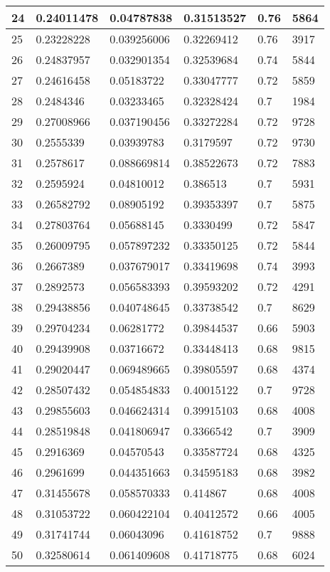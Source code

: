 \begin{longtable}{|l|l|l|l|l|l|}
24 & 0.24011478 & 0.04787838 & 0.31513527 & 0.76 & 5864 \\ \hline 
25 & 0.23228228 & 0.039256006 & 0.32269412 & 0.76 & 3917 \\ \hline 
26 & 0.24837957 & 0.032901354 & 0.32539684 & 0.74 & 5844 \\ \hline 
27 & 0.24616458 & 0.05183722 & 0.33047777 & 0.72 & 5859 \\ \hline 
28 & 0.2484346 & 0.03233465 & 0.32328424 & 0.7 & 1984 \\ \hline 
29 & 0.27008966 & 0.037190456 & 0.33272284 & 0.72 & 9728 \\ \hline 
30 & 0.2555339 & 0.03939783 & 0.3179597 & 0.72 & 9730 \\ \hline 
31 & 0.2578617 & 0.088669814 & 0.38522673 & 0.72 & 7883 \\ \hline 
32 & 0.2595924 & 0.04810012 & 0.386513 & 0.7 & 5931 \\ \hline 
33 & 0.26582792 & 0.08905192 & 0.39353397 & 0.7 & 5875 \\ \hline 
34 & 0.27803764 & 0.05688145 & 0.3330499 & 0.72 & 5847 \\ \hline 
35 & 0.26009795 & 0.057897232 & 0.33350125 & 0.72 & 5844 \\ \hline 
36 & 0.2667389 & 0.037679017 & 0.33419698 & 0.74 & 3993 \\ \hline 
37 & 0.2892573 & 0.056583393 & 0.39593202 & 0.72 & 4291 \\ \hline 
38 & 0.29438856 & 0.040748645 & 0.33738542 & 0.7 & 8629 \\ \hline 
39 & 0.29704234 & 0.06281772 & 0.39844537 & 0.66 & 5903 \\ \hline 
40 & 0.29439908 & 0.03716672 & 0.33448413 & 0.68 & 9815 \\ \hline 
41 & 0.29020447 & 0.069489665 & 0.39805597 & 0.68 & 4374 \\ \hline 
42 & 0.28507432 & 0.054854833 & 0.40015122 & 0.7 & 9728 \\ \hline 
43 & 0.29855603 & 0.046624314 & 0.39915103 & 0.68 & 4008 \\ \hline 
44 & 0.28519848 & 0.041806947 & 0.3366542 & 0.7 & 3909 \\ \hline 
45 & 0.2916369 & 0.04570543 & 0.33587724 & 0.68 & 4325 \\ \hline 
46 & 0.2961699 & 0.044351663 & 0.34595183 & 0.68 & 3982 \\ \hline 
47 & 0.31455678 & 0.058570333 & 0.414867 & 0.68 & 4008 \\ \hline 
48 & 0.31053722 & 0.060422104 & 0.40412572 & 0.66 & 4005 \\ \hline 
49 & 0.31741744 & 0.06043096 & 0.41618752 & 0.7 & 9888 \\ \hline 
50 & 0.32580614 & 0.061409608 & 0.41718775 & 0.68 & 6024 \\ \hline 
\end{longtable}